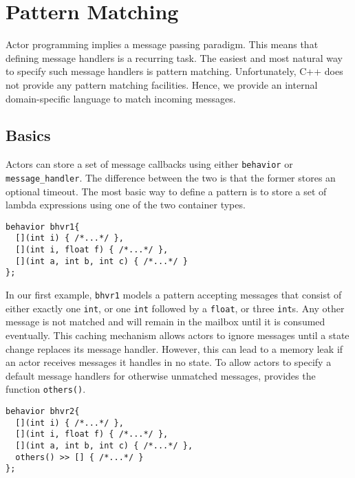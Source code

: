 \section{Pattern Matching}
\label{Sec::PatternMatching}

Actor programming implies a message passing paradigm.
This means that defining message handlers is a recurring task.
The easiest and most natural way to specify such message handlers is pattern matching.
Unfortunately, C++ does not provide any pattern matching facilities.
Hence, we provide an internal domain-specific language to match incoming messages.

\subsection{Basics}
\label{Sec::PatternMatching::Basics}

Actors can store a set of message callbacks using either \lstinline^behavior^ or \lstinline^message_handler^.
The difference between the two is that the former stores an optional timeout.
The most basic way to define a pattern is to store a set of lambda expressions using one of the two container types.

\begin{lstlisting}
behavior bhvr1{
  [](int i) { /*...*/ },
  [](int i, float f) { /*...*/ },
  [](int a, int b, int c) { /*...*/ }
};
\end{lstlisting}

In our first example, \lstinline^bhvr1^ models a pattern accepting messages that consist of either exactly one \lstinline^int^, or one \lstinline^int^ followed by a \lstinline^float^, or three \lstinline^int^s.
Any other message is not matched and will remain in the mailbox until it is consumed eventually.
This caching mechanism allows actors to ignore messages until a state change replaces its message handler.
However, this can lead to a memory leak if an actor receives messages it handles in no state.
To allow actors to specify a default message handlers for otherwise unmatched messages, \lib provides the function \lstinline^others()^.

\begin{lstlisting}
behavior bhvr2{
  [](int i) { /*...*/ },
  [](int i, float f) { /*...*/ },
  [](int a, int b, int c) { /*...*/ },
  others() >> [] { /*...*/ }
};
\end{lstlisting}

